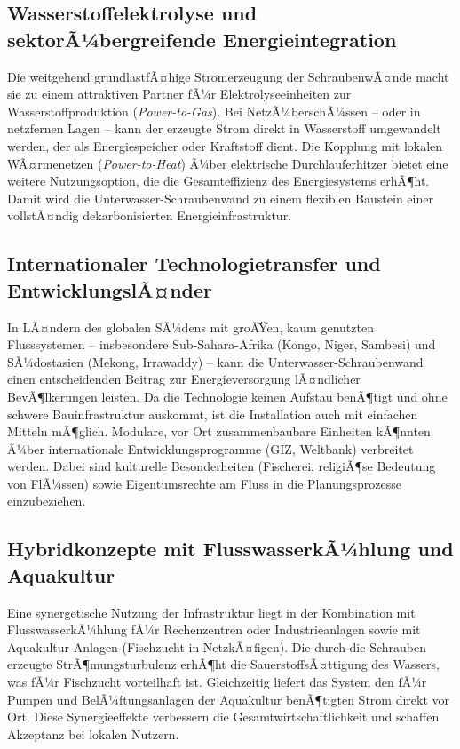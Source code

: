 ﻿\documentclass[a4paper,12pt]{article}
\theoremstyle{definition}
\begin{document}
\subsection{Wasserstoffelektrolyse und sektorÃ¼bergreifende Energieintegration}

Die weitgehend grundlastfÃ¤hige Stromerzeugung der SchraubenwÃ¤nde macht sie zu einem
attraktiven Partner fÃ¼r Elektrolyseeinheiten zur Wasserstoffproduktion (\emph{Power-to-Gas}).
Bei NetzÃ¼berschÃ¼ssen -- oder in netzfernen Lagen -- kann der erzeugte Strom direkt
in Wasserstoff umgewandelt werden, der als Energiespeicher oder Kraftstoff dient.
Die Kopplung mit lokalen WÃ¤rmenetzen (\emph{Power-to-Heat}) Ã¼ber elektrische
Durchlauferhitzer bietet eine weitere Nutzungsoption, die die Gesamteffizienz des
Energiesystems erhÃ¶ht. Damit wird die Unterwasser-Schraubenwand zu einem flexiblen
Baustein einer vollstÃ¤ndig dekarbonisierten Energieinfrastruktur.

\subsection{Internationaler Technologietransfer und EntwicklungslÃ¤nder}

In LÃ¤ndern des globalen SÃ¼dens mit groÃŸen, kaum genutzten Flusssystemen --
insbesondere Sub-Sahara-Afrika (Kongo, Niger, Sambesi) und SÃ¼dostasien (Mekong,
Irrawaddy) -- kann die Unterwasser-Schraubenwand einen entscheidenden Beitrag
zur Energieversorgung lÃ¤ndlicher BevÃ¶lkerungen leisten. Da die Technologie
keinen Aufstau benÃ¶tigt und ohne schwere Bauinfrastruktur auskommt, ist die
Installation auch mit einfachen Mitteln mÃ¶glich. Modulare, vor Ort zusammenbaubare
Einheiten kÃ¶nnten Ã¼ber internationale Entwicklungsprogramme (GIZ, Weltbank)
verbreitet werden. Dabei sind kulturelle Besonderheiten (Fischerei, religiÃ¶se
Bedeutung von FlÃ¼ssen) sowie Eigentumsrechte am Fluss in die Planungsprozesse
einzubeziehen.

\subsection{Hybridkonzepte mit FlusswasserkÃ¼hlung und Aquakultur}

Eine synergetische Nutzung der Infrastruktur liegt in der Kombination mit
FlusswasserkÃ¼hlung fÃ¼r Rechenzentren oder Industrieanlagen sowie mit
Aquakultur-Anlagen (Fischzucht in NetzkÃ¤figen). Die durch die Schrauben
erzeugte StrÃ¶mungsturbulenz erhÃ¶ht die SauerstoffsÃ¤ttigung des Wassers,
was fÃ¼r Fischzucht vorteilhaft ist. Gleichzeitig liefert das System den fÃ¼r
Pumpen und BelÃ¼ftungsanlagen der Aquakultur benÃ¶tigten Strom direkt vor Ort.
Diese Synergieeffekte verbessern die Gesamtwirtschaftlichkeit und schaffen
Akzeptanz bei lokalen Nutzern.
\end{document}
